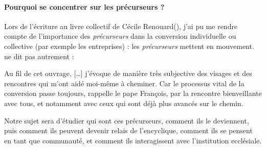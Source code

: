 \paragraph{Pourquoi se concentrer sur les précurseurs ? } Lors de l'écriture au livre collectif de Cécile Renouard(\cite{Renouard_entreprise_2015}), j'ai pu me rendre compte de l'importance des \textit{précurseurs} dans la conversion individuelle ou collective (par exemple les entreprises) : les \textit{précurseurs} mettent en mouvement. \cite{lang_generations_2020} ne dit pas autrement :
\begin{singlequote}
        Au fil de cet ouvrage, [\ldots] j'évoque de manière très subjective des visages et des rencontres qui m'ont aidé moi-même à cheminer. Car le processus vital de la conversion passe toujours, rappelle le pape François, par la rencontre bienveillante avec tous, et notamment avec ceux qui sont déjà plus avancés sur le chemin. \cite[p. 11]{lang_generations_2020}
\end{singlequote}
Notre sujet sera d'étudier qui sont ces précurseurs, comment ils le deviennent, puis comment ils peuvent devenir relais de l'encyclique, comment ils se pensent en tant que communauté, et comment ils interagissent  avec l'institution ecclésiale.


